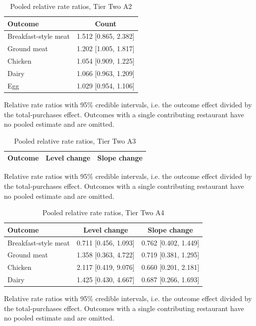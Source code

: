 \begin{table}[H]
\centering
\caption{Pooled relative rate ratios, Tier Two A2}
\label{tab:rr_t2_a2}
\begin{tabular}{lc}
\toprule
Outcome & Count \\
\midrule
Breakfast-style meat & 1.512 [0.865, 2.382] \\
Ground meat & 1.202 [1.005, 1.817] \\
Chicken & 1.054 [0.909, 1.225] \\
Dairy & 1.066 [0.963, 1.209] \\
Egg & 1.029 [0.954, 1.106] \\
\bottomrule
\end{tabular}
\par\smallskip\footnotesize Relative rate ratios with 95\% credible intervals, i.e. the outcome effect divided by the total-purchases effect. Outcomes with a single contributing restaurant have no pooled estimate and are omitted.
\end{table}

\begin{table}[H]
\centering
\caption{Pooled relative rate ratios, Tier Two A3}
\label{tab:rr_t2_a3}
\begin{tabular}{lcc}
\toprule
Outcome & Level change & Slope change \\
\midrule
\bottomrule
\end{tabular}
\par\smallskip\footnotesize Relative rate ratios with 95\% credible intervals, i.e. the outcome effect divided by the total-purchases effect. Outcomes with a single contributing restaurant have no pooled estimate and are omitted.
\end{table}

\begin{table}[H]
\centering
\caption{Pooled relative rate ratios, Tier Two A4}
\label{tab:rr_t2_a4}
\begin{tabular}{lcc}
\toprule
Outcome & Level change & Slope change \\
\midrule
Breakfast-style meat & 0.711 [0.456, 1.093] & 0.762 [0.402, 1.449] \\
Ground meat & 1.358 [0.363, 4.722] & 0.719 [0.381, 1.295] \\
Chicken & 2.117 [0.419, 9.076] & 0.660 [0.201, 2.181] \\
Dairy & 1.425 [0.430, 4.667] & 0.687 [0.266, 1.693] \\
\bottomrule
\end{tabular}
\par\smallskip\footnotesize Relative rate ratios with 95\% credible intervals, i.e. the outcome effect divided by the total-purchases effect. Outcomes with a single contributing restaurant have no pooled estimate and are omitted.
\end{table}

